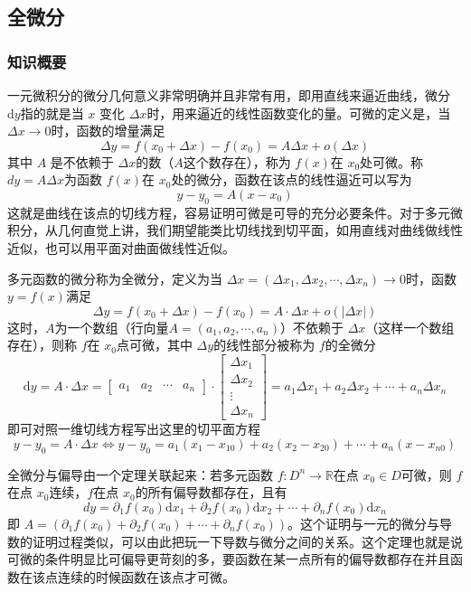 \subsection{全微分}
\subsubsection{知识概要}
一元微积分的微分几何意义非常明确并且非常有用，即用直线来逼近曲线，微分 $\mathrm{d} y$指的就是当 $x$ 变化 $\Delta x$时，用来逼近的线性函数变化的量。可微的定义是，当 $\Delta x  \to 0$时，函数的增量满足
$$
\Delta y = f(x_0 + \Delta x) - f(x_0) = A \Delta x + o(\Delta x)
$$
其中 $A$ 是不依赖于 $\Delta x$的数（$A$这个数存在），称为 $f(x)$在 $x_0$处可微。称 $dy = A \Delta x$为函数 $f(x)$在 $x_0$处的微分，函数在该点的线性逼近可以写为
$$
y - y_0 = A(x-x_0)
$$
这就是曲线在该点的切线方程，容易证明可微是可导的充分必要条件。对于多元微积分，从几何直觉上讲，我们期望能类比切线找到切平面，如用直线对曲线做线性近似，也可以用平面对曲面做线性近似。

多元函数的微分称为全微分，定义为当 $\Delta x = (\Delta x _1, \Delta x_2, \cdots, \Delta x_n) \to 0$时，函数 $y = f(x)$满足
$$
\Delta y = f(x_0 + \Delta x) - f(x_0) = A \cdot \Delta x + o(|\Delta x|)
$$
这时，$A$为一个数组（行向量$A = (a_1, a_2, \cdots, a_n)$）不依赖于 $\Delta x$（这样一个数组存在），则称 $f$在 $x_0$点可微，其中 $\Delta y$的线性部分被称为 $f$的全微分
$$ 
\mathrm{d} y = A \cdot \Delta x = \begin{bmatrix}
a_1  & a_2 & \cdots & a_n
\end{bmatrix}
\cdot
\begin{bmatrix}
\Delta x_1 \\
\Delta x_2 \\
\vdots \\
\Delta x_n
\end{bmatrix}
= a_1 \Delta x_1 + a_2 \Delta x_2 + \cdots + a_n \Delta x_n
$$
即可对照一维切线方程写出这里的切平面方程
$$
y - y_0 = A \cdot \Delta x \Leftrightarrow y - y_0 = a_1 (x_1-x_{10}) + a_2 (x_2 - x_{20}) + \cdots + a_n (x-x_{n0})
$$

全微分与偏导由一个定理关联起来：若多元函数 $f:D ^n \to \mathbb{R}$在点 $x_0 \in D$可微，则 $f$ 在点 $x_0$连续，$f$在点 $x_0$的所有偏导数都存在，且有
$$
dy = \partial _1 f(x_0) \mathrm{d} x_1 + \partial _2 f(x_0) \mathrm{d} x_2  + \cdots + \partial _n f(x_0) \mathrm{d} x_n
$$
即 $A = (\partial _1 f(x_0)  + \partial _2 f(x_0)   + \cdots + \partial _n f(x_0) )$。这个证明与一元的微分与导数的证明过程类似，可以由此把玩一下导数与微分之间的关系。这个定理也就是说可微的条件明显比可偏导更苛刻的多，要函数在某一点所有的偏导数都存在并且函数在该点连续的时候函数在该点才可微。

